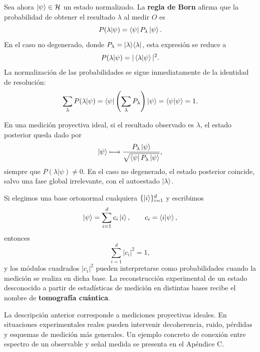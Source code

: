 \documentclass[../main.tex]{subfiles}
\begin{document}
Sea ahora $\ket{\psi}\in\mathcal{H}$ un estado normalizado. La \textbf{regla de Born} afirma que la probabilidad de obtener el resultado $\lambda$ al medir $O$ es
\begin{equation}\label{eq:born-main}
    P(\lambda|\psi)=\bra{\psi}P_\lambda\ket{\psi}.
\end{equation}
En el caso no degenerado, donde $P_\lambda=\ket{\lambda}\!\bra{\lambda}$, esta expresión se reduce a
\begin{equation*}
    P(\lambda|\psi)=|\braket{\lambda|\psi}|^2.
\end{equation*}
La normalización de las probabilidades se sigue inmediatamente de la identidad de resolución:
\begin{equation*}
    \sum_{\lambda}P(\lambda|\psi)
    =
    \bra{\psi}\left(\sum_{\lambda}P_\lambda\right)\ket{\psi}
    =
    \braket{\psi|\psi}
    =
    1.
\end{equation*}

En una medición proyectiva ideal, si el resultado observado es $\lambda$, el estado posterior queda dado por
\begin{equation*}
    \ket{\psi}\longmapsto \frac{P_\lambda\ket{\psi}}{\sqrt{\bra{\psi}P_\lambda\ket{\psi}}},
\end{equation*}
siempre que $P(\lambda|\psi)\neq 0$. En el caso no degenerado, el estado posterior coincide, salvo una fase global irrelevante, con el autoestado $\ket{\lambda}$.

Si elegimos una base ortonormal cualquiera $\{\ket{i}\}_{i=1}^{d}$ y escribimos
\begin{equation*}
    \ket{\psi}=\sum_{i=1}^{d}c_i\ket{i},
    \qquad
    c_i=\braket{i|\psi},
\end{equation*}
entonces
\begin{equation*}
    \sum_{i=1}^{d}|c_i|^2=1,
\end{equation*}
y los módulos cuadrados $|c_i|^2$ pueden interpretarse como probabilidades cuando la medición se realiza en dicha base. La reconstrucción experimental de un estado desconocido a partir de estadísticas de medición en distintas bases recibe el nombre de \textbf{tomografía cuántica}.

\begin{observacion}
La descripción anterior corresponde a mediciones proyectivas ideales. En situaciones experimentales reales pueden intervenir decoherencia, ruido, pérdidas y esquemas de medición más generales. Un ejemplo concreto de conexión entre espectro de un observable y señal medida se presenta en el Apéndice C.
\end{observacion}
\end{document}
